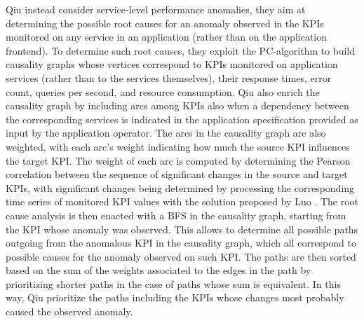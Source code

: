{%
Qiu \etal \cite{46_Qiu2020_CausalityMiningKnowledgeGraph} instead consider service-level performance anomalies, \viz they aim at determining the possible root causes for an anomaly observed in the KPIs monitored on any service in an application (rather than on the application frontend).
To determine such root causes, they exploit the PC-algorithm \cite{Spirtes2000_CausationPredictionSearchPCAlgoritm} to build causality graphs whose vertices correspond to KPIs monitored on application services (rather than to the services themselves), \viz their response times, error count, queries per second, and resource consumption.
Qiu \etal \cite{46_Qiu2020_CausalityMiningKnowledgeGraph} also enrich the causality graph by including arcs among KPIs also when a dependency between the corresponding services is indicated in the application specification provided as input by the application operator.
The arcs in the causality graph are also weighted, with each arc's weight indicating how much the source KPI influences the target KPI. 
The weight of each arc is computed by determining the Pearson correlation between the sequence of significant changes in the source and target KPIs, with significant changes being determined by processing the corresponding time series of monitored KPI values with the solution proposed by Luo \etal \cite{Luo2014_CorrelatingEventsIncidentDiagnosis}.
The root cause analysis is then enacted with a BFS in the causality graph, starting from the KPI whose anomaly was observed.
This allows to determine all possible paths outgoing from the anomalous KPI in the causality graph, which all correspond to possible causes for the anomaly observed on such KPI. 
The paths are then sorted based on the sum of the weights associated to the edges in the path by prioritizing shorter paths in the case of paths whose sum is equivalent. 
In this way, Qiu \etal \cite{46_Qiu2020_CausalityMiningKnowledgeGraph} prioritize the paths including the KPIs whose changes most probably caused the observed anomaly.
}


